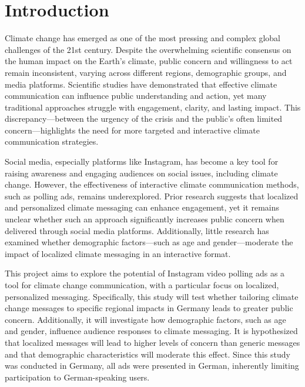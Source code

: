 \documentclass[a4paper,11pt]{article}
\begin{document}

\section{Introduction}
Climate change has emerged as one of the most pressing and complex global challenges of the 21st century. Despite the overwhelming scientific consensus on the human impact on the Earth's climate, public concern and willingness to act remain inconsistent, varying across different regions, demographic groups, and media platforms. Scientific studies have demonstrated that effective climate communication can influence public understanding and action, yet many traditional approaches struggle with engagement, clarity, and lasting impact. This discrepancy—between the urgency of the crisis and the public’s often limited concern—highlights the need for more targeted and interactive climate communication strategies.

Social media, especially platforms like Instagram, has become a key tool for raising awareness and engaging audiences on social issues, including climate change. However, the effectiveness of interactive climate communication methods, such as polling ads, remains underexplored. Prior research suggests that localized and personalized climate messaging can enhance engagement, yet it remains unclear whether such an approach significantly increases public concern when delivered through social media platforms. Additionally, little research has examined whether demographic factors—such as age and gender—moderate the impact of localized climate messaging in an interactive format.

This project aims to explore the potential of Instagram video polling ads as a tool for climate change communication, with a particular focus on localized, personalized messaging. Specifically, this study will test whether tailoring climate change messages to specific regional impacts in Germany leads to greater public concern. Additionally, it will investigate how demographic factors, such as age and gender, influence audience responses to climate messaging. It is hypothesized that localized messages will lead to higher levels of concern than generic messages and that demographic characteristics will moderate this effect. Since this study was conducted in Germany, all ads were presented in German, inherently limiting participation to German-speaking users.
\end{document}
